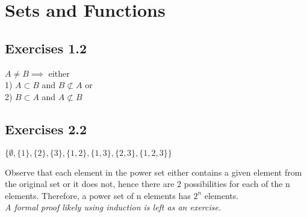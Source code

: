 \section{Sets and Functions}
\subsection{Exercises 1.2}
\setcounter{question}{0}

\begin{solution}
  $A \neq B \implies$ either \\
  1) $A \subset B$ and $B \not\subset A$ or\\
  2) $B \subset A$ and $A \not\subset B$\\
\end{solution}

\setcounter{question}{0}
\subsection{Exercises 2.2}
\setcounter{question}{0}
\begin{solution}
  $\{\emptyset, \{1\}, \{2\}, \{3\}, \{1,2\}, \{1,3\}, \{2,3\}, \{1,2,3\}\}$
\end{solution}

\begin{solution}
  Observe that each element in the power set either contains a given element from the original set or it does not, hence there are 2 possibilities for each of the n elements. Therefore, a power set of n elements has $2^n$ elements.\\\textit{A formal proof likely using induction is left as an exercise.}
\end{solution}

